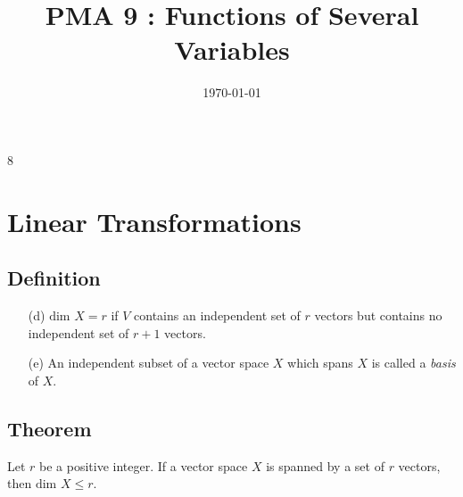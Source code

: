 \documentclass{article}
\title{PMA 9 : Functions of Several Variables}
\author{}
\date{\today}
\renewcommand\dim{\ensuremath{\text{dim }}}
\begin{document}
\maketitle
\tableofcontents

\newpage

\setcounter{section}8

\section{Linear Transformations}

%
\subsection{Definition}
\begin{enumerate}[label=(\alph*)]
\item[(d)]
\(\dim X=r\) if \(V\) contains an independent set of \(r\) vectors but contains no independent set of \(r+1\) vectors.
\item[(e)]
An independent subset of a vector space \(X\) which spans \(X\) is called a \emph{basis} of \(X\).
\end{enumerate}

%
\subsection{Theorem}
Let \(r\) be a positive integer.
If a vector space \(X\) is spanned by  a set of \(r\) vectors, then \(\dim X\le r\).
\end{document}
